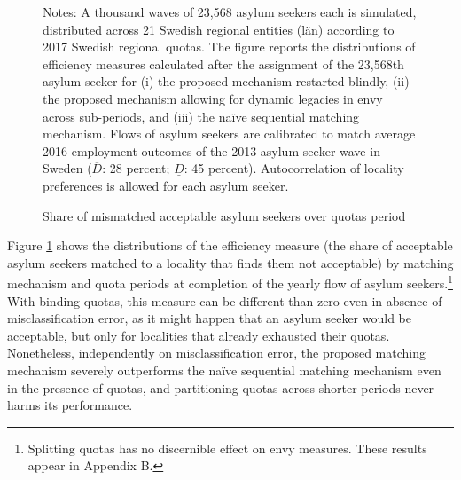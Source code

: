 \documentclass[12pt,fleqn]{article}
\begin{document}
\begin{figure}
	\caption{Share of mismatched acceptable asylum seekers over quotas period \label{FIG-quotas}}
	\begin{center}
	\end{center}
		{\scriptsize \vspace{-1em}
	\begin{singlespace}
		{\sc Notes:} A thousand waves of 23,568 asylum seekers each is simulated, distributed across 21 Swedish regional entities (l\"{a}n) according to 2017 Swedish regional quotas. The figure reports the distributions of efficiency measures calculated after the assignment of the 23,568th asylum seeker for (i) the proposed mechanism restarted blindly, (ii) the proposed mechanism allowing for dynamic legacies in envy across sub-periods, and (iii) the na\"{i}ve sequential matching mechanism. Flows of asylum seekers are calibrated to match average 2016 employment outcomes of the 2013 asylum seeker wave in Sweden ($\overline{D}$: 28 percent; $\underline{D}$: 45 percent). Autocorrelation of locality preferences is allowed for each asylum seeker.
	\end{singlespace}
	 }
\end{figure}

Figure \ref{FIG-quotas} shows the distributions of the efficiency measure (the share of acceptable asylum seekers matched to a locality that finds them not acceptable) by matching mechanism and quota periods at completion of the yearly flow of asylum seekers.\footnote{Splitting quotas has no discernible effect on envy measures. These results appear in Appendix B.} With binding quotas, this measure can be different than zero even in absence of misclassification error, as it might happen that an asylum seeker would be acceptable, but only for localities that already exhausted their quotas. Nonetheless, independently on misclassification error, the proposed matching mechanism severely outperforms the na\"{i}ve sequential matching mechanism even in the presence of quotas, and partitioning quotas across shorter periods never harms its performance.
\end{document}
